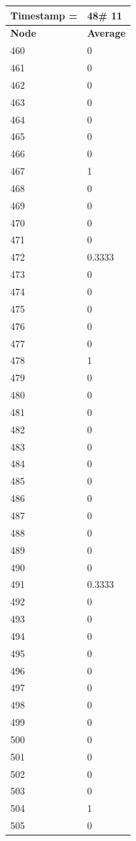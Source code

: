 \begin{tabular}{|l||l|}
\hline
\textbf{Timestamp =} & \textbf{48}\# 11\\\hline
	\textbf{Node} & \textbf{Average} \\ \hline
\hline
	460 & 0 \\ \hline
	461 & 0 \\ \hline
	462 & 0 \\ \hline
	463 & 0 \\ \hline
	464 & 0 \\ \hline
	465 & 0 \\ \hline
	466 & 0 \\ \hline
	467 & 1 \\ \hline
	468 & 0 \\ \hline
	469 & 0 \\ \hline
	470 & 0 \\ \hline
	471 & 0 \\ \hline
	472 & 0.3333 \\ \hline
	473 & 0 \\ \hline
	474 & 0 \\ \hline
	475 & 0 \\ \hline
	476 & 0 \\ \hline
	477 & 0 \\ \hline
	478 & 1 \\ \hline
	479 & 0 \\ \hline
	480 & 0 \\ \hline
	481 & 0 \\ \hline
	482 & 0 \\ \hline
	483 & 0 \\ \hline
	484 & 0 \\ \hline
	485 & 0 \\ \hline
	486 & 0 \\ \hline
	487 & 0 \\ \hline
	488 & 0 \\ \hline
	489 & 0 \\ \hline
	490 & 0 \\ \hline
	491 & 0.3333 \\ \hline
	492 & 0 \\ \hline
	493 & 0 \\ \hline
	494 & 0 \\ \hline
	495 & 0 \\ \hline
	496 & 0 \\ \hline
	497 & 0 \\ \hline
	498 & 0 \\ \hline
	499 & 0 \\ \hline
	500 & 0 \\ \hline
	501 & 0 \\ \hline
	502 & 0 \\ \hline
	503 & 0 \\ \hline
	504 & 1 \\ \hline
	505 & 0 \\ \hline
\end{tabular}
